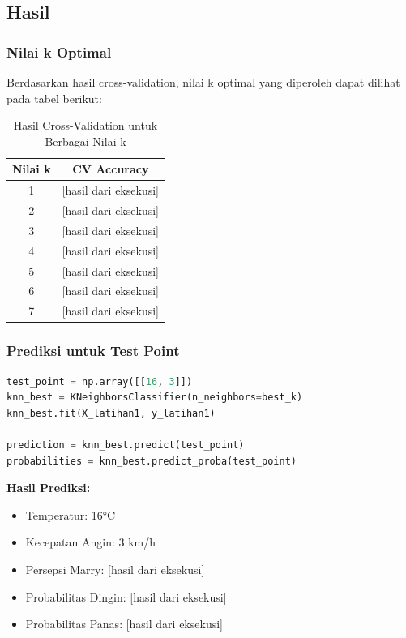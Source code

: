 \documentclass[12pt,a4paper]{article}
\begin{document}
\subsection{Hasil}

\subsubsection{Nilai k Optimal}
Berdasarkan hasil cross-validation, nilai k optimal yang diperoleh dapat dilihat pada tabel berikut:

\begin{table}[H]
\centering
\caption{Hasil Cross-Validation untuk Berbagai Nilai k}
\begin{tabular}{|c|c|}
\hline
\textbf{Nilai k} & \textbf{CV Accuracy} \\
\hline
1 & [hasil dari eksekusi] \\
2 & [hasil dari eksekusi] \\
3 & [hasil dari eksekusi] \\
4 & [hasil dari eksekusi] \\
5 & [hasil dari eksekusi] \\
6 & [hasil dari eksekusi] \\
7 & [hasil dari eksekusi] \\
\hline
\end{tabular}
\end{table}

\subsubsection{Prediksi untuk Test Point}
\begin{lstlisting}[language=Python, caption=Prediksi dengan k Terbaik]
test_point = np.array([[16, 3]])
knn_best = KNeighborsClassifier(n_neighbors=best_k)
knn_best.fit(X_latihan1, y_latihan1)

prediction = knn_best.predict(test_point)
probabilities = knn_best.predict_proba(test_point)
\end{lstlisting}

\textbf{Hasil Prediksi:}
\begin{itemize}
    \item Temperatur: 16°C
    \item Kecepatan Angin: 3 km/h
    \item Persepsi Marry: [hasil dari eksekusi]
    \item Probabilitas Dingin: [hasil dari eksekusi]
    \item Probabilitas Panas: [hasil dari eksekusi]
\end{itemize}
\end{document}
